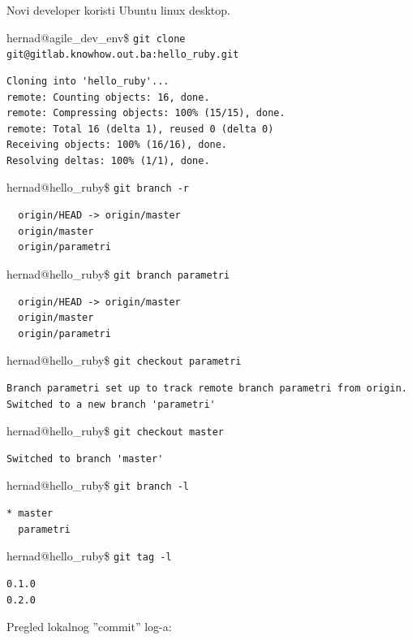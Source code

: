 \documentclass[times, utf8, seminar]{fit}
\begin{document}
Novi developer koristi Ubuntu linux desktop.

\setlength{\parindent}{0cm}

hernad@agile\_dev\_env\$ \texttt{git clone git@gitlab.knowhow.out.ba:hello\_ruby.git}
\begin{lstlisting}
Cloning into 'hello_ruby'...
remote: Counting objects: 16, done.
remote: Compressing objects: 100% (15/15), done.
remote: Total 16 (delta 1), reused 0 (delta 0)
Receiving objects: 100% (16/16), done.
Resolving deltas: 100% (1/1), done.
\end{lstlisting}

hernad@hello\_ruby\$ \texttt{git branch -r}
\begin{lstlisting}
  origin/HEAD -> origin/master
  origin/master
  origin/parametri
\end{lstlisting}


hernad@hello\_ruby\$ \texttt{git branch parametri}
\begin{lstlisting}
  origin/HEAD -> origin/master
  origin/master
  origin/parametri
\end{lstlisting}


hernad@hello\_ruby\$ \texttt{git checkout parametri}
\begin{lstlisting}
Branch parametri set up to track remote branch parametri from origin.
Switched to a new branch 'parametri'
\end{lstlisting}


hernad@hello\_ruby\$ \texttt{git checkout master}
\begin{lstlisting}
Switched to branch 'master'
\end{lstlisting}


hernad@hello\_ruby\$ \texttt{git branch -l}
\begin{lstlisting}
* master
  parametri
\end{lstlisting}

hernad@hello\_ruby\$ \texttt{git tag -l}
\begin{lstlisting}
0.1.0
0.2.0
\end{lstlisting}

Pregled lokalnog ''commit'' log-a:
\end{document}
